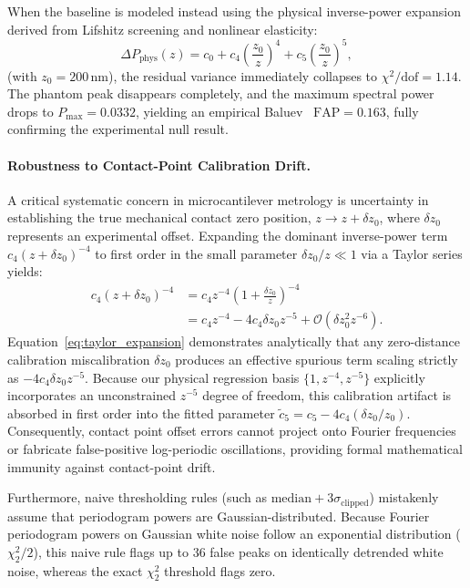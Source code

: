 \documentclass[10pt,twocolumn,a4paper]{article}
\begin{document}
When the baseline is modeled instead using the physical inverse-power expansion derived from Lifshitz screening and nonlinear elasticity:
\begin{equation}
\Delta P_{\mathrm{phys}}(z) = c_0 + c_4 \left(\frac{z_0}{z}\right)^4 + c_5 \left(\frac{z_0}{z}\right)^5,
\label{eq:phys_basis}
\end{equation}
(with $z_0 = 200\,\mathrm{nm}$), the residual variance immediately collapses to $\chi^2/\mathrm{dof} = 1.14$. The phantom peak disappears completely, and the maximum spectral power drops to $P_{\max} = 0.0332$, yielding an empirical Baluev~\cite{baluev2008} $\mathrm{FAP} = 0.163$, fully confirming the experimental null result.

\paragraph{Robustness to Contact-Point Calibration Drift.}
A critical systematic concern in microcantilever metrology is uncertainty in establishing the true mechanical contact zero position, $z \to z + \delta z_0$, where $\delta z_0$ represents an experimental offset. Expanding the dominant inverse-power term $c_4 (z + \delta z_0)^{-4}$ to first order in the small parameter $\delta z_0 / z \ll 1$ via a Taylor series yields:
\begin{align}
c_4 \left( z + \delta z_0 \right)^{-4} &= c_4 z^{-4} \left( 1 + \frac{\delta z_0}{z} \right)^{-4} \nonumber \\
&= c_4 z^{-4} - 4 c_4 \delta z_0 z^{-5} + \mathcal{O}\left( \delta z_0^2 z^{-6} \right).
\label{eq:taylor_expansion}
\end{align}
Equation~\eqref{eq:taylor_expansion} demonstrates analytically that any zero-distance calibration miscalibration $\delta z_0$ produces an effective spurious term scaling strictly as $-4 c_4 \delta z_0 z^{-5}$. Because our physical regression basis $\{1, z^{-4}, z^{-5}\}$ explicitly incorporates an unconstrained $z^{-5}$ degree of freedom, this calibration artifact is absorbed in first order into the fitted parameter $\tilde{c}_5 = c_5 - 4 c_4 (\delta z_0 / z_0)$. Consequently, contact point offset errors cannot project onto Fourier frequencies or fabricate false-positive log-periodic oscillations, providing formal mathematical immunity against contact-point drift.

Furthermore, naive thresholding rules (such as $\mathrm{median} + 3\sigma_{\mathrm{clipped}}$) mistakenly assume that periodogram powers are Gaussian-distributed. Because Fourier periodogram powers on Gaussian white noise follow an exponential distribution ($\chi^2_2/2$), this naive rule flags up to 36 false peaks on identically detrended white noise, whereas the exact $\chi^2_2$ threshold flags zero.
\end{document}
